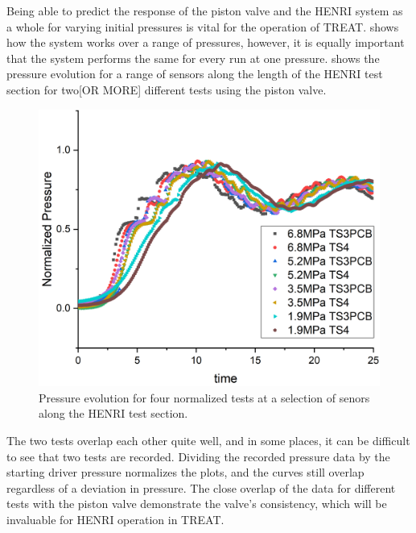 Being able to predict the response of the piston valve and the HENRI system as a whole for varying initial pressures is vital for the operation of TREAT.  shows how the system works over a range of pressures, however, it is equally important that the system performs the same for every run at one pressure.  shows the pressure evolution for a range of sensors along the length of the HENRI test section for two[OR MORE] different tests using the piston valve.


\begin{figure}[htbp]
    \vspace{16pt}
    \centering
    \includegraphics[width=\textwidth]{results/plots/normalized_FFKM.png}
    \caption{Pressure evolution for four normalized tests at a selection of senors along the HENRI test section.}
    \label{fig:piston rel}
    \vspace{16pt}
\end{figure}

The two tests overlap each other quite well, and in some places, it can be difficult to see that two tests are recorded. Dividing the recorded pressure data by the starting driver pressure normalizes the plots, and the curves still overlap regardless of a deviation in pressure. The close overlap of the data for different tests with the piston valve demonstrate the valve's consistency, which will be invaluable for HENRI operation in TREAT.


